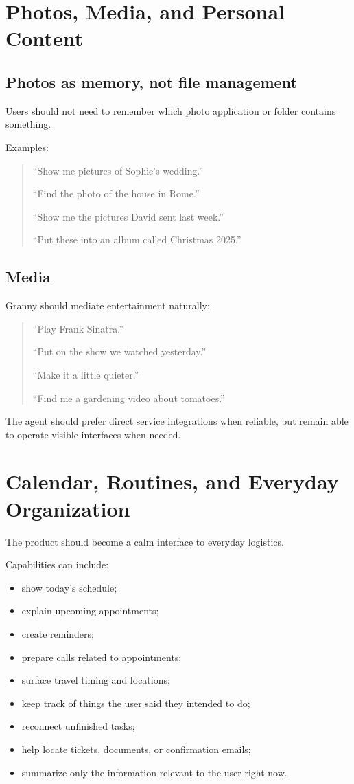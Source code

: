 \documentclass[11pt]{article}
\begin{document}
\section{Photos, Media, and Personal Content}

\subsection{Photos as memory, not file management}
Users should not need to remember which photo application or folder contains something.

Examples:

\begin{quote}
``Show me pictures of Sophie's wedding.''

``Find the photo of the house in Rome.''

``Show me the pictures David sent last week.''

``Put these into an album called Christmas 2025.''
\end{quote}

\subsection{Media}
Granny should mediate entertainment naturally:

\begin{quote}
``Play Frank Sinatra.''

``Put on the show we watched yesterday.''

``Make it a little quieter.''

``Find me a gardening video about tomatoes.''
\end{quote}

The agent should prefer direct service integrations when reliable, but remain able to operate visible interfaces when needed.

\section{Calendar, Routines, and Everyday Organization}

The product should become a calm interface to everyday logistics.

Capabilities can include:

\begin{itemize}[leftmargin=*]
    \item show today's schedule;
    \item explain upcoming appointments;
    \item create reminders;
    \item prepare calls related to appointments;
    \item surface travel timing and locations;
    \item keep track of things the user said they intended to do;
    \item reconnect unfinished tasks;
    \item help locate tickets, documents, or confirmation emails;
    \item summarize only the information relevant to the user right now.
\end{itemize}
\end{document}
